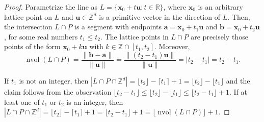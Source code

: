 \documentclass[11pt]{article}
\newcommand{\ba}{\mathbf{a}}
\newcommand{\bb}{\mathbf{b}}
\newcommand{\bu}{\mathbf{u}}
\newcommand{\bx}{\mathbf{x}}
\newcommand{\Z}{\mathbb{Z}}
\newcommand{\N}{\mathbb{N}}
\DeclareMathOperator{\vol}{vol}
\DeclareMathOperator{\nvol}{nvol}
\begin{document}

    

\begin{proof}
Parametrize the line as $L = \{\bx_0 + t\bu : t \in \mathbb{R}\}$, where $\bx_0$ is an arbitrary lattice point on $L$ and $\bu \in \mathbb{Z}^d$ is a primitive vector in the direction of $L$. Then, the intersection $L \cap P$ is a segment with endpoints $\ba = \bx_0 + t_1\bu$ and $\bb = \bx_0 + t_2\bu$, for some real numbers $t_1 \leq t_2$.
The lattice points in $L \cap P$ are precisely those points of the form $\bx_0 + k\bu$ with $k \in \mathbb{Z} \cap [t_1, t_2]$. Moreover,
\[
\nvol(L \cap P) = \frac{\|\bb - \ba\|}{\|\bu\|} = \frac{\|(t_2 - t_1) \bu\|}{\|\bu\|} = |t_2 - t_1|=t_2-t_1.
\]

If $t_1$ is not an integer, then $|L \cap P \cap \mathbb{Z}^d| 
= \lfloor t_2 \rfloor - \lceil t_1 \rceil + 1 = \lfloor t_2 \rfloor - \lfloor t_1 \rfloor$
and the claim follows from the observation
$\lfloor t_2-t_1 \rfloor \leq \lfloor t_2 \rfloor - \lfloor t_1 \rfloor \leq \lfloor t_2-t_1 \rfloor +1$. If at least one of $t_1$ or $t_2$ is an integer, then
$|L \cap P \cap \Z^d| = \lfloor t_2 \rfloor - \lceil t_1 \rceil + 1 = \lfloor t_2 - t_1 \rfloor + 1=\lfloor \nvol(L \cap P) \rfloor +1$.
\end{proof}
\end{document}
